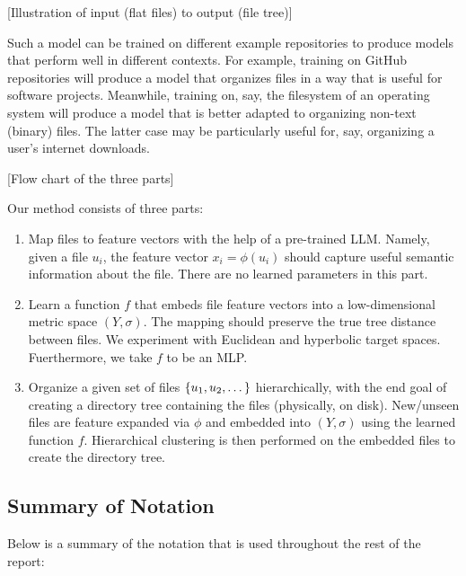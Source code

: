 \documentclass{article}
\begin{document}
  [Illustration of input (flat files) to output (file tree)]

Such a model can be trained on different example repositories to produce models that perform well in different contexts. For example, training on GitHub repositories will produce a model that organizes files in a way that is useful for software projects. Meanwhile, training on, say, the filesystem of an operating system will produce a model that is better adapted to organizing non-text (binary) files. The latter case may be particularly useful for, say, organizing a user's internet downloads.


  [Flow chart of the three parts]

Our method consists of three parts:

\begin{enumerate}
  \item Map files to feature vectors with the help of a pre-trained LLM. Namely, given a file $u_i$, the feature vector $x_i = \phi(u_i)$ should capture useful semantic information about the file. There are no learned parameters in this part.
  \item Learn a function $f$ that embeds file feature vectors into a low-dimensional metric space $(Y, \sigma)$. The mapping should preserve the true tree distance between files. We experiment with Euclidean and hyperbolic target spaces. Fuerthermore, we take $f$ to be an MLP.
  \item Organize a given set of files $\qty{u_1, u_2, \dots}$ hierarchically, with the end goal of creating a directory tree containing the files (physically, on disk). New/unseen files are feature expanded via $\phi$ and embedded into $(Y, \sigma)$ using the learned function $f$. Hierarchical clustering is then performed on the embedded files to create the directory tree.
\end{enumerate}

\subsection{Summary of Notation}

Below is a summary of the notation that is used throughout the rest of the report:
\end{document}
